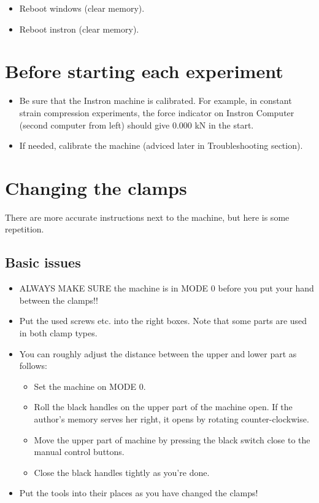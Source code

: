 \documentclass[a4paper]{article}
\begin{document}
\begin{itemize}
  \item Reboot windows (clear memory).
  \item Reboot instron (clear memory).
\end{itemize}

\section{Before starting each experiment}

\begin{itemize}
  \item Be sure that the Instron machine is calibrated. For example, in constant strain compression experiments, the force indicator on Instron Computer (second computer from left) should give 0.000 kN in the start.
  \item If needed, calibrate the machine (adviced later in Troubleshooting section).
\end{itemize}

\section{Changing the clamps}

There are more accurate instructions next to the machine, but here is some repetition. 

\subsection{Basic issues}

\begin{itemize}
  \item ALWAYS MAKE SURE the machine is in \textsf{MODE 0} before you put your hand between the clamps!!
  \item Put the used screws etc. into the right boxes. Note that some parts are used in both clamp types.
  \item You can roughly adjust the distance between the upper and lower part as follows:
  \begin{itemize}
    \item Set the machine on \textsf{MODE 0}.
    \item Roll the black handles on the upper part of the machine open. If the author's memory serves her right, it opens by rotating counter-clockwise.
    \item Move the upper part of machine by pressing the black switch close to the manual control buttons.
    \item Close the black handles tightly as you're done.
  \end{itemize}
  \item Put the tools into their places as you have changed the clamps!
\end{itemize}
\end{document}
